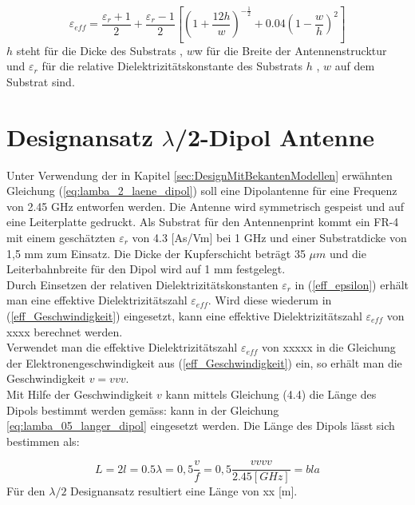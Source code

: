 \begin{equation}\label{eff_epsilon}
\varepsilon_{eff}=\dfrac{\varepsilon_r+1}{2}+\dfrac{\varepsilon_r-1}{2}\left[\left(1+\dfrac{12h}{w}\right)^{-\frac{1}{2}}+0.04\left(1-\dfrac{w}{h}\right)^{2}\right]
\end{equation}
$h$ steht für die Dicke des Substrats , $w$w für die Breite der Antennenstrucktur und  $\varepsilon_{r}$ für die relative Dielektrizitätskonstante des Substrats
$h$ , $w$  auf dem Substrat  sind. 

\section{Designansatz $\lambda$/2-Dipol Antenne}  
Unter Verwendung der in Kapitel \ref{sec:DesignMitBekantenModellen} erwähnten Gleichung (\ref{eq:lamba_2_laene_dipol}) soll eine Dipolantenne für eine Frequenz von 2.45 GHz entworfen werden. Die Antenne wird symmetrisch gespeist und auf eine Leiterplatte gedruckt. Als Substrat für den Antennenprint kommt ein  FR-4  mit einem geschätzten  $\varepsilon_r $ von 4.3 [As/Vm] bei 1 GHz und einer Substratdicke von 1,5 mm  zum Einsatz. Die Dicke der Kupferschicht beträgt 35 $\mu m$ und  die Leiterbahnbreite für den Dipol wird auf 1 mm festgelegt.\\

%
Durch Einsetzen der relativen Dielektrizitätskonstanten $\varepsilon_{r}$ in (\ref{eff_epsilon}) erhält man eine effektive Dielektrizitätszahl $\varepsilon_{eff}$.
Wird diese wiederum in (\ref{eff_Geschwindigkeit}) eingesetzt,  kann eine effektive Dielektrizitätszahl $\varepsilon_{eff}$  von xxxx berechnet werden.\\

Verwendet man die effektive Dielektrizitätszahl $\varepsilon_{eff}$ von xxxxx  in die Gleichung der Elektronengeschwindigkeit aus  (\ref{eff_Geschwindigkeit}) ein, so erhält man die Geschwindigkeit $v=vvv$. \\
Mit Hilfe der Geschwindigkeit $v$ kann mittels Gleichung (4.4) die Länge des Dipols bestimmt werden gemäss:  kann in der  Gleichung \ref{eq:lamba_05_langer_dipol} eingesetzt werden. Die Länge des Dipols lässt sich bestimmen als:

\begin{equation}\label{eq:lamba_05_langer_dipol}
L=2l = 0.5 \lambda= 0,5\dfrac{v}{f}=0,5 \dfrac{vvvv}{2.45[GHz]}=bla
\end{equation} 
Für den $\lambda/2$ Designansatz resultiert eine Länge von xx [m].
